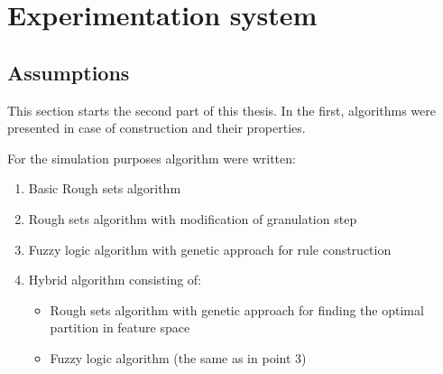 \section{Experimentation system}
\label{cha:ExperimentAnalysis}
\subsection{Assumptions}
This section starts the second part of this thesis. In the first, algorithms
were presented in case of construction and their properties.

For the simulation purposes algorithm were written:
\begin{enumerate}
    \item Basic Rough sets algorithm
    \item Rough sets algorithm with modification of granulation step
    \item Fuzzy logic algorithm with genetic approach for rule construction
    \item Hybrid algorithm consisting of:
        \begin{itemize}
            \item Rough sets algorithm with genetic approach for finding the
                optimal partition in feature space
            \item Fuzzy logic algorithm (the same as in point 3)
        \end{itemize}
\end{enumerate}

